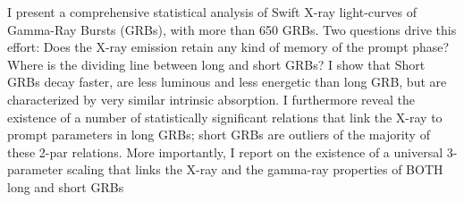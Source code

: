 


\bigskip



\bigskip

\noindent I present a comprehensive statistical analysis of Swift X-ray light-curves of Gamma-Ray Bursts (GRBs), with more than 650 GRBs. Two questions drive this effort: Does the X-ray emission retain any kind of memory of the prompt phase? Where is the dividing line between long and short GRBs? I show that Short GRBs decay faster, are less luminous and less energetic than long GRB, but are characterized by very similar intrinsic absorption. I furthermore reveal the existence of a number of statistically significant relations that link the X-ray to prompt parameters in long GRBs; short GRBs are outliers of the majority of these 2-par relations. More importantly, I report on the existence of a universal 3-parameter scaling that links the X-ray and the gamma-ray properties of BOTH long and short GRBs
